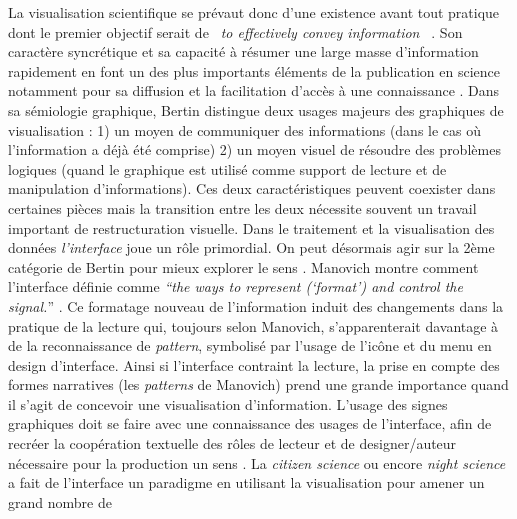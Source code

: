 La visualisation scientifique se pr\'evaut donc d{\textquoteright}une
existence avant tout pratique dont le premier objectif serait de
\textit{{\guillemotleft}~to effectively convey
information~{\guillemotright}} \citep{Kelleher2011}. Son
caract\`ere syncr\'etique et sa capacit\'e \`a r\'esumer une large
masse d{\textquoteright}information rapidement en font un des plus
importants \'el\'ements de la publication en science notamment pour sa
diffusion et la facilitation d{\textquoteright}acc\`es \`a une
connaissance \citep{Ware2004}. Dans sa s\'emiologie graphique, Bertin
\citep{Bertin1977} distingue deux usages majeurs des graphiques de visualisation :
1) un moyen de communiquer des informations (dans le cas o\`u
l{\textquoteright}information a d\'ej\`a \'et\'e comprise) 2) un moyen
visuel de r\'esoudre des probl\`emes logiques (quand le graphique est
utilis\'e comme support de lecture et de manipulation
d{\textquoteright}informations). Ces deux caract\'eristiques peuvent
coexister dans certaines pi\`eces mais la transition entre les deux
n\'ecessite souvent un travail important de restructuration visuelle.
Dans le traitement et la visualisation des donn\'ees
\textit{l{\textquoteright}interface }joue un r\^ole primordial. On peut
d\'esormais agir sur la 2\`eme cat\'egorie de Bertin pour mieux
explorer le sens \citep{Weissberg2007}. Manovich montre comment
l{\textquoteright}interface d\'efinie comme
\textit{{\textquotedblleft}the ways to represent
({\textquoteleft}format{\textquoteright}) and control the
signal.}{\textquotedblright} \citep{Manovich2013}. Ce formatage nouveau de
l{\textquoteright}information induit des changements dans la pratique
de la lecture qui, toujours selon Manovich,
s{\textquoteright}apparenterait davantage \`a de la reconnaissance de
\textit{pattern}, symbolis\'e par l{\textquoteright}usage de
l{\textquoteright}ic\^one et du menu en design
d{\textquoteright}interface. Ainsi si l{\textquoteright}interface
contraint la lecture, la prise en compte des formes narratives (les
\textit{patterns} de Manovich) prend une grande importance quand il
s{\textquoteright}agit de concevoir une visualisation
d{\textquoteright}information. L{\textquoteright}usage des signes
graphiques doit se faire avec une connaissance des usages de
l{\textquoteright}interface, afin de recr\'eer la coop\'eration
textuelle des r\^oles de lecteur et de designer/auteur n\'ecessaire
pour la production un sens \citep{Eco1985}. La \textit{citizen science} ou
encore \textit{night science} a fait de l{\textquoteright}interface un
paradigme en utilisant la visualisation pour amener un grand nombre de
